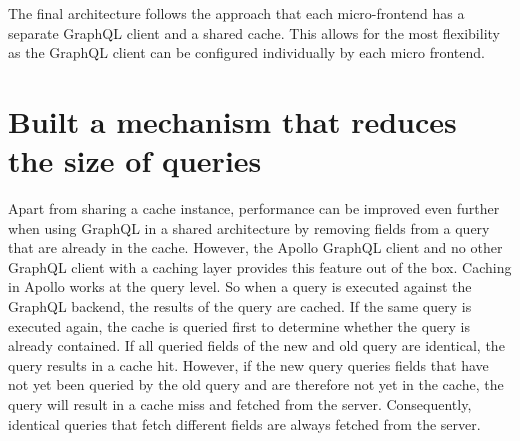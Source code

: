 The final architecture follows the approach that each micro-frontend has a separate GraphQL client and a shared cache. This allows for the most flexibility as the GraphQL client can be configured individually by each micro frontend.


\ifshowUnusedContent

\fi

\section{Built a mechanism that reduces the size of queries}

Apart from sharing a cache instance, performance can be improved even further when using GraphQL in a shared architecture by removing fields from a query that are already in the cache.
However, the Apollo GraphQL client and no other GraphQL client with a caching layer provides this feature out of the box. Caching in Apollo works at the query level. So when a query is executed against the GraphQL backend, the results of the query are cached. If the same query is executed again, the cache is queried first to determine whether the query is already contained. If all queried fields of the new and old query are identical, the query results in a cache hit. However, if the new query queries fields that have not yet been queried by the old query and are therefore not yet in the cache, the query will result in a cache miss and fetched from the server. Consequently, identical queries that fetch different fields are always fetched from the server.

